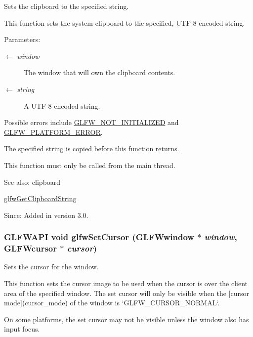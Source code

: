 Sets the clipboard to the specified string. 

This function sets the system clipboard to the specified, UTF-8 encoded string.

\begin{Desc}
\item[Parameters:]
\begin{description}
\item[\mbox{$\leftarrow$} {\em window}]The window that will own the clipboard contents. \item[\mbox{$\leftarrow$} {\em string}]A UTF-8 encoded string.\end{description}
\end{Desc}
Possible errors include \hyperlink{group__errors_g2374ee02c177f12e1fa76ff3ed15e14a}{GLFW\_\-NOT\_\-INITIALIZED} and \hyperlink{group__errors_gd44162d78100ea5e87cdd38426b8c7a1}{GLFW\_\-PLATFORM\_\-ERROR}.

The specified string is copied before this function returns.

This function must only be called from the main thread.

\begin{Desc}
\item[See also:]clipboard 

\hyperlink{group__input_g3ac90c8bbaf0b46063bb02b574f3b6f7}{glfwGetClipboardString}\end{Desc}
\begin{Desc}
\item[Since:]Added in version 3.0. \end{Desc}
\hypertarget{group__input_gfaf103cea2f43530cff7de4e01126a4f}{
\subsubsection[glfwSetCursor]{\setlength{\rightskip}{0pt plus 5cm}GLFWAPI void glfwSetCursor ({\bf GLFWwindow} $\ast$ {\em window}, \/  {\bf GLFWcursor} $\ast$ {\em cursor})}}
\label{group__input_gfaf103cea2f43530cff7de4e01126a4f}


Sets the cursor for the window. 

This function sets the cursor image to be used when the cursor is over the client area of the specified window. The set cursor will only be visible when the \mbox{[}cursor mode\mbox{]}(cursor\_\-mode) of the window is `GLFW\_\-CURSOR\_\-NORMAL`.

On some platforms, the set cursor may not be visible unless the window also has input focus.

